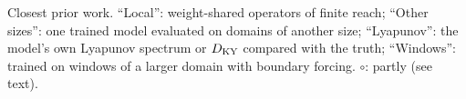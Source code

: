 \begin{table}[htbp]
\caption{Closest prior work. ``Local'': weight-shared operators of finite
reach; ``Other sizes'': one trained model evaluated on domains of another
size; ``Lyapunov'': the model's own Lyapunov spectrum or $\DKY$ compared
with the truth; ``Windows'': trained on windows of a larger domain with
boundary forcing. $\circ$: partly (see text).}
\label{tab:prior_work}
\end{table}
